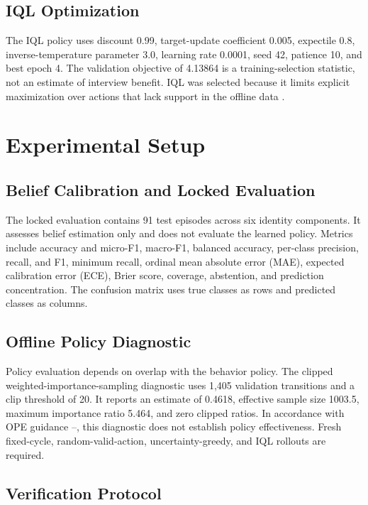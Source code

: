 \documentclass[journal]{IEEEtran}
\begin{document}
\subsection{IQL Optimization}

The IQL policy uses discount 0.99, target-update coefficient 0.005, expectile 0.8, inverse-temperature parameter 3.0, learning rate 0.0001, seed 42, patience 10, and best epoch 4. The validation objective of 4.13864 is a training-selection statistic, not an estimate of interview benefit. IQL was selected because it limits explicit maximization over actions that lack support in the offline data \cite{kostrikov2021iql}.

\section{Experimental Setup}

\subsection{Belief Calibration and Locked Evaluation}

The locked evaluation contains 91 test episodes across six identity components. It assesses belief estimation only and does not evaluate the learned policy. Metrics include accuracy and micro-F1, macro-F1, balanced accuracy, per-class precision, recall, and F1, minimum recall, ordinal mean absolute error (MAE), expected calibration error (ECE), Brier score, coverage, abstention, and prediction concentration. The confusion matrix uses true classes as rows and predicted classes as columns.


\subsection{Offline Policy Diagnostic}

Policy evaluation depends on overlap with the behavior policy. The clipped weighted-importance-sampling diagnostic uses 1,405 validation transitions and a clip threshold of 20. It reports an estimate of 0.4618, effective sample size 1003.5, maximum importance ratio 5.464, and zero clipped ratios. In accordance with OPE guidance \cite{thomas2015hcope}--\cite{patterson2023empirical}, this diagnostic does not establish policy effectiveness. Fresh fixed-cycle, random-valid-action, uncertainty-greedy, and IQL rollouts are required.


\subsection{Verification Protocol}
\end{document}
